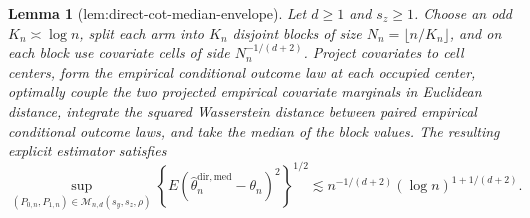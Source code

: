 \documentclass{article}
\newtheorem{lemma}{Lemma}
\begin{document}
\begin{lemma}[lem:direct-cot-median-envelope]\label{lem:direct-cot-median-envelope}
Let \(d\ge1\) and \(s_z\ge1\). Choose an odd \(K_n\asymp\log n\), split each arm into \(K_n\) disjoint blocks of size \(N_n=\lfloor n/K_n\rfloor\), and on each block use covariate cells of side \(N_n^{-1/(d+2)}\). Project covariates to cell centers, form the empirical conditional outcome law at each occupied center, optimally couple the two projected empirical covariate marginals in Euclidean distance, integrate the squared Wasserstein distance between paired empirical conditional outcome laws, and take the median of the block values. The resulting explicit estimator satisfies
\[
\sup_{(P_{0,n},P_{1,n})\in\mathcal M_{n,d}(s_y,s_z,\rho)}
\left\{E(\widehat\theta_n^{\mathrm{dir,med}}-\theta_n)^2\right\}^{1/2}
\lesssim n^{-1/(d+2)}(\log n)^{1+1/(d+2)}.
\]
\end{lemma}
\end{document}
